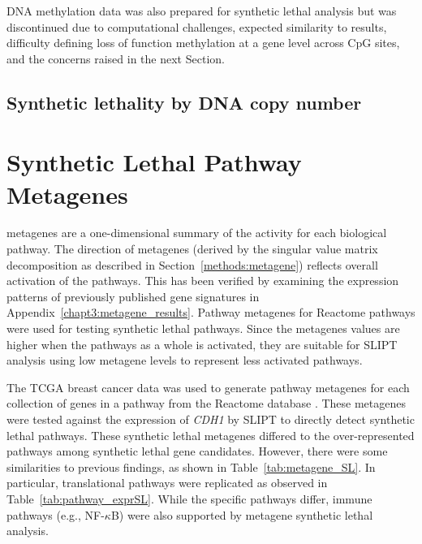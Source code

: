 DNA methylation data was also prepared for \gls{synthetic lethal} analysis but was discontinued due to computational challenges, expected similarity to  results, difficulty defining loss of function methylation at a gene level across CpG sites, and the concerns raised in the next Section. 

\subsection{Synthetic lethality by \acrshort{DNA} copy number}


\fi

\FloatBarrier

\section{Synthetic Lethal Pathway Metagenes} \label{chapt3:metagene_SL}

\Glspl{metagene} are a one-dimensional summary of the activity for each biological \gls{pathway}. The direction of \glspl{metagene} (derived by the singular value matrix decomposition as described in Section~\ref{methods:metagene}) reflects overall activation of the \glspl{pathway}. This has been verified by examining the expression patterns of previously published gene signatures \citep{Gatza2011, Gatza2014} in Appendix~\ref{chapt3:metagene_results}.
%
Pathway \glspl{metagene} for Reactome \glspl{pathway} %
were used for testing \gls{synthetic lethal} \glspl{pathway}. Since the \glspl{metagene} values are higher when the \glspl{pathway} as a whole is activated, they are suitable for \gls{SLIPT} analysis using low \gls{metagene} levels to represent less activated \glspl{pathway}. 

The \gls{TCGA} breast cancer  data was used to generate \gls{pathway} \glspl{metagene} for each collection of genes in a \gls{pathway} from the Reactome database \citep{Reactome}. These metagenes were tested against the expression of \textit{CDH1} by \gls{SLIPT} to directly detect \gls{synthetic lethal} \glspl{pathway}.
These \gls{synthetic lethal} \glspl{metagene} differed to the over-represented \glspl{pathway} among \gls{synthetic lethal} gene candidates. However, there were some similarities to previous findings, as shown in Table~\ref{tab:metagene_SL}. In particular, translational \glspl{pathway} were replicated as observed in Table~\ref{tab:pathway_exprSL}. While the specific \glspl{pathway} differ, immune \glspl{pathway} (e.g., NF-$\kappa$B) were also supported by \gls{metagene} \gls{synthetic lethal} analysis.

